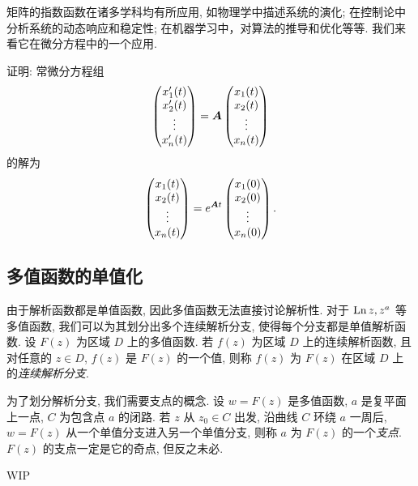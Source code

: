矩阵的指数函数在诸多学科均有所应用, 如物理学中描述系统的演化; 在控制论中分析系统的动态响应和稳定性; 在机器学习中，对算法的推导和优化等等.
我们来看它在微分方程中的一个应用.
\begin{subex}
  \item 证明: 常微分方程组
  \[
    \begin{pmatrix}
      x_1'(t)\\
      x_2'(t)\\
      \vdots\\
      x_n'(t)
    \end{pmatrix}
    ={\boldsymbol{A}}
    \begin{pmatrix}
      x_1(t)\\
      x_2(t)\\
      \vdots\\
      x_n(t)
    \end{pmatrix}
  \]
  的解为
  \[
    \begin{pmatrix}
      x_1(t)\\
      x_2(t)\\
      \vdots\\
      x_n(t)
    \end{pmatrix}=e^{{\boldsymbol{A}} t}\begin{pmatrix}
      x_1(0)\\
      x_2(0)\\
      \vdots\\
      x_n(0)
    \end{pmatrix}.
  \]
\end{subex}


\subsection{多值函数的单值化}

由于解析函数都是单值函数, 因此多值函数无法直接讨论解析性.
对于 $\operatorname{Ln} z,z^a$ 等多值函数, 我们可以为其划分出多个连续解析分支, 使得每个分支都是单值解析函数.
设 $F(z)$ 为区域 $D$ 上的多值函数.
若 $f(z)$ 为区域 $D$ 上的连续解析函数, 且对任意的 $z\in D$, $f(z)$ 是 $F(z)$ 的一个值, 则称 $f(z)$ 为 $F(z)$ 在区域 $D$ 上的\emph{连续解析分支}.


为了划分解析分支, 我们需要支点的概念.
设 $w=F(z)$ 是多值函数, $a$ 是复平面上一点, $C$ 为包含点 $a$ 的闭路.
若 $z$ 从 $z_0\in C$ 出发, 沿曲线 $C$ 环绕 $a$ 一周后, $w=F(z)$ 从一个单值分支进入另一个单值分支, 则称 $a$ 为 $F(z)$ 的一个\emph{支点}.
$F(z)$ 的支点一定是它的奇点, 但反之未必.

WIP